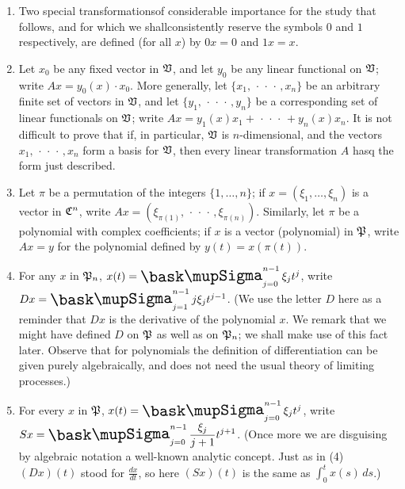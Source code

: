 \begin{enumerate}[wide, nosep, label=(\arabic*)]
    \item Two special transformationsof considerable importance for the study
    that follows, and for which we shallconsistently reserve the symbols \(0\)
    and \(1\) respectively, are defined (for all \(x\)) by \(0x = 0\) and \(1x =
    x\).

    \item Let \(x_0\) be any fixed vector in \(\mathfrak{V}\), and let \(y_0\) be any
    linear functional on \(\mathfrak{V}\); write \(Ax = y_0(x) \cdot x_0\). More
    generally, let \(\{x_1, \,\cdot\,\cdot\,\cdot\,, x_n\}\) be an arbitrary
    finite set of vectors in \(\mathfrak{V}\), and let \(\{y_1,
    \,\cdot\,\cdot\,\cdot\,, y_n\}\) be a corresponding set of linear
    functionals on \(\mathfrak{V}\); write \(Ax = y_1(x) x_1 + \,\cdot\,\cdot\,\cdot\,
    + y_n(x) x_n\). It is not difficult to prove that if, in particular,
    \(\mathfrak{V}\) is \(n\)-dimensional, and the vectors \(x_1,
    \,\cdot\,\cdot\,\cdot\,, x_n\) form a basis for \(\mathfrak{V}\), then every
    linear transformation \(A\) hasq the form just described.

    \item Let \(\pi\) be a permutation of the integers \(\{1, \dots, n\}\); if
    \(x = (\xi_1, \dots, \xi_n)\) is a vector in \(\mathfrak{C}^n\), write \(Ax =
    (\xi_{\pi(1)}, \,\cdot\,\cdot\,\cdot\,, \xi_{\pi(n)})\). Similarly, let
    \(\pi\) be a polynomial with complex coefficients; if \(x\) is a vector
    (polynomial) in \(\mathfrak{P}\), write \(Ax = y\) for the polynomial defined by
    \(y(t) = x(\pi(t))\).
    
    \item For any \(x\) in \(\mathfrak{P}_n\), \(x(t) = \sumx_{j=0}^{n-1} \xi_j
    t^j\), write \(Dx = \sumx_{j=1}^{n-1} j \xi_j t^{j-1}\). (We use the letter
    \(D\) here as a reminder that \(Dx\) is the derivative of the polynomial
    \(x\). We remark that we might have defined \(D\) on \(\mathfrak{P}\) as well as
    on \(\mathfrak{P}_n\); we shall make use of this fact later. Observe that for
    polynomials the definition of differentiation can be given purely
    algebraically, and does not need the usual theory of limiting processes.)

    \item For every \(x\) in \(\mathfrak{P}\), \(x(t) = \sumx_{j=0}^{n-1} \xi_j
    t^j\), write \(\displaystyle Sx =
    \sumx_{j=0}^{n-1}{\frac{\xi_j}{j+1}t^{j+1}}\). (Once more we are disguising
    by algebraic notation a well-known analytic concept. Just as in (4)
    \((Dx)(t)\) stood for \(\displaystyle\frac{dx}{dt}\), so here \((Sx)(t)\) is
    the same as \(\int_0^t x(s) \,ds\).)


\end{enumerate}
